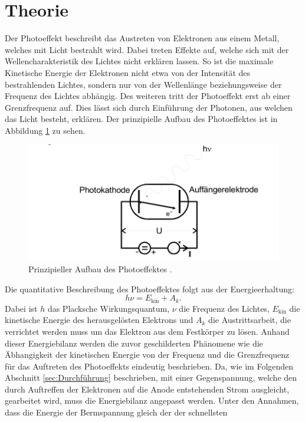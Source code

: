 \section{Theorie}
\label{sec:Theorie}
Der Photoeffekt beschreibt das Austreten von Elektronen aus einem Metall, welches mit Licht bestrahlt wird. Dabei treten Effekte auf, welche sich mit der Wellencharakteristik des Lichtes nicht erklären lassen.
So ist die maximale Kinetische Energie der Elektronen nicht etwa von der Intensität des bestrahlenden Lichtes, sondern nur von der Wellenlänge beziehungsweise der Frequenz des Lichtes abhängig. Des weiteren
tritt der Photoeffekt erst ab einer Grenzfrequenz auf. Dies lässt sich durch
Einführung der Photonen, aus welchen das Licht besteht, erklären. Der prinzipielle Aufbau des Photoeffektes ist in Abbildung \ref{fig:Prinzip} zu sehen.
\begin{figure}
  \centering
  \includegraphics{images/Prinzip.png}
  \caption{Prinzipieller Aufbau des Photoeffektes \cite{sample}.}
  \label{fig:Prinzip}
\end{figure}
Die quantitative Beschreibung des Photoeffektes folgt aus der Energieerhaltung:
\begin{equation}
  h \nu = E_\text{kin} + A_k .
  \label{eqn:energie1}
\end{equation}
Dabei ist $h$ das Placksche Wirkungsquantum, $\nu$ die Frequenz des Lichtes, $E_\text{kin}$ die kinetische Energie des herausgelösten Elektrons und $A_k$ die Austrittsarbeit, die verrichtet werden muss um das Elektron aus dem
Festkörper zu lösen. Anhand dieser Energiebilanz werden die zuvor geschilderten Phänomene wie die Äbhangigkeit der kinetischen Energie von der Frequenz und die Grenzfrequenz für das Auftreten des Photoeffekts eindeutig beschrieben.
Da, wie im Folgenden Abschnitt \ref{sec:Durchführung} beschrieben, mit einer Gegenspannung, welche den durch Auftreffen der Elektronen auf die Anode entstehenden Strom ausgleicht, gearbeitet wird, muss die Energiebilanz angepasst werden.
Unter den Annahmen, dass die Energie der Bermspannung gleich der der schnellsten
